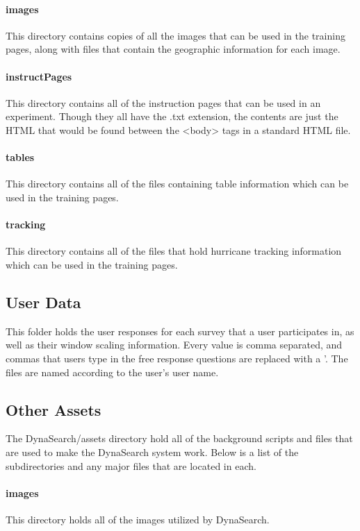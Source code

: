 \documentclass[article]{ij4uq}              %
\begin{document}
\paragraph{images}
This directory contains copies of all the images that can be used in the training pages, along with files that contain the geographic information for each image.

\paragraph{instructPages}
This directory contains all of the instruction pages that can be used in an experiment. Though they all have the .txt extension, the contents are just the HTML that would be found between the <body> tags in a standard HTML file. 

\paragraph{tables}
This directory contains all of the files containing table information which can be used in the training pages.

\paragraph{tracking}
This directory contains all of the files that hold hurricane tracking information which can be used in the training pages.

\subsection{User Data}
This folder holds the user responses for each survey that a user participates in, as well as their window scaling information. Every value is comma separated, and commas that users type in the free response questions are replaced with a '. The files are named according to the user's user name.

\subsection{Other Assets}
The DynaSearch/assets directory hold all of the background scripts and files that are used to make the DynaSearch system work. Below is a list of the subdirectories and any major files that are located in each.

\paragraph{images}
This directory holds all of the images utilized by DynaSearch.
\end{document}
